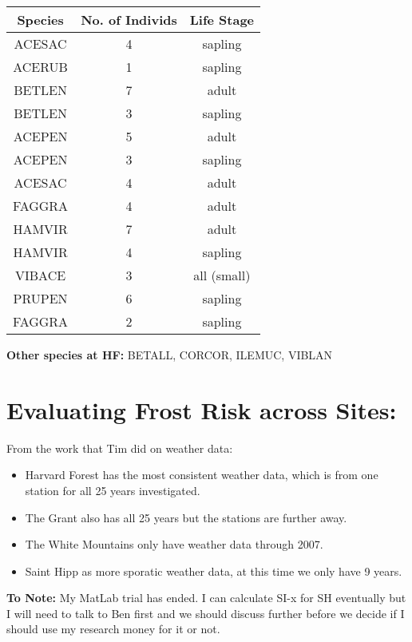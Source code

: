 \documentclass{article}\usepackage[]{graphicx}\usepackage[]{color}
\begin{document}
\begin{center}
 \label{tab:hf} 
\footnotesize
\begin{tabular}{|c | c | c |}
\hline
\textbf{Species} & \textbf{No. of Individs} & \textbf{Life Stage} \\
\hline
ACESAC & 4 & sapling \\
\hline
ACERUB & 1 & sapling  \\
\hline
BETLEN & 7 & adult  \\
\hline
BETLEN & 3 & sapling  \\
\hline
ACEPEN & 5 & adult  \\
\hline
ACEPEN & 3 & sapling  \\
\hline
ACESAC & 4 & adult  \\
\hline
FAGGRA & 4 & adult  \\
\hline
HAMVIR & 7 & adult  \\
\hline
HAMVIR & 4 & sapling  \\
\hline
VIBACE & 3 & all (small)  \\
\hline
PRUPEN & 6 & sapling  \\
\hline
FAGGRA & 2 & sapling  \\
\hline
\end{tabular}
\end{center}

\textbf{Other species at HF:} BETALL, CORCOR, ILEMUC, VIBLAN

\section*{Evaluating Frost Risk across Sites:}

From the work that Tim did on weather data:
\begin{itemize}
\item Harvard Forest has the most consistent weather data, which is from one station for all 25 years investigated.
\item The Grant also has all 25 years but the stations are further away.
\item The White Mountains only have weather data through 2007.
\item Saint Hipp as more sporatic weather data, at this time we only have 9 years.
\end{itemize}

\textbf{To Note:} My MatLab trial has ended. I can calculate SI-x for SH eventually but I will need to talk to Ben first and we should discuss further before we decide if I should use my research money for it or not. 
\end{document}
